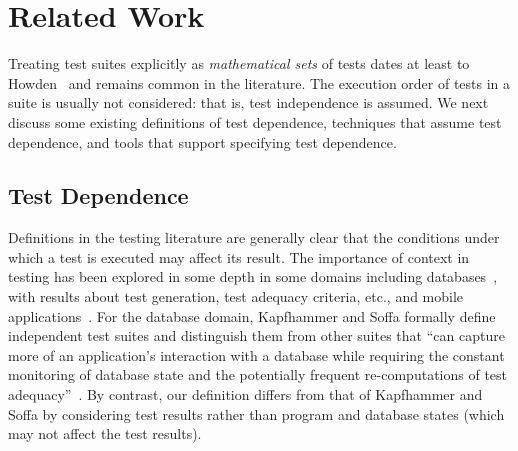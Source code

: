\section{Related Work}
\label{sec:related}


Treating test suites explicitly as \emph{mathematical sets} of tests dates at least
to Howden~\cite[p.~554]{howden:ToC:1975} and remains common in the literature.
The execution order of tests in a suite is usually not considered:
that is, test independence is assumed. We next discuss some
existing definitions of test dependence, techniques that
assume test dependence, and tools that support specifying
test dependence.

\subsection{Test Dependence}

Definitions in the testing literature are generally clear that the
conditions under which a test is executed may affect its result. 
The
importance of context in testing has been explored in some depth in
some domains including databases~\cite{Gray:1994:QGB:191843.191886,Chays:2000:FTD:347324.348954,
kapfhammeretal:FSE:2003}, with results about test
generation, test adequacy criteria, etc., and mobile
applications~\cite{Wang:2007:AGC}.
For the database domain, Kapfhammer and Soffa formally
define independent test suites and distinguish them from
other suites that ``can capture more of an application's
interaction with a database while requiring the constant monitoring of
database state and the potentially frequent re-computations of test
adequacy''~\cite[p.~101]{kapfhammeretal:FSE:2003}.
By contrast, our definition differs from that of Kapfhammer
and Soffa by considering
test results rather than program and database states
(which may not affect the test results).

